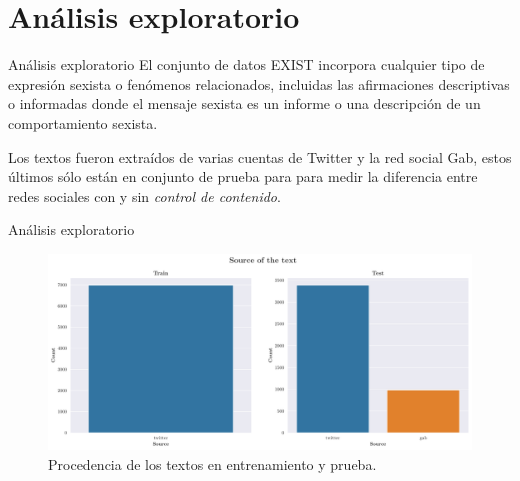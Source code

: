 \documentclass[10pt]{beamer}
\begin{document}
\section{Análisis exploratorio}
\begin{frame}{Análisis exploratorio}
\justify	
\small
El conjunto de datos EXIST incorpora cualquier tipo de expresión sexista o fenómenos relacionados, incluidas las afirmaciones descriptivas o informadas donde el mensaje sexista es un informe o una descripción de un comportamiento sexista. \medskip

Los textos fueron extraídos de varias cuentas de Twitter y la red social Gab, estos últimos sólo están en conjunto de prueba para para medir la diferencia entre redes sociales con y sin \emph{control de contenido}.

\begin{table}[H]
\centering
{}
\caption{Cantidad de textos en el conjunto de entrenamiento y prueba.}
\end{table}

\end{frame}

\begin{frame}{Análisis exploratorio}
\justify	
\small

\begin{figure}[H]
\centering
\includegraphics[width=0.8\linewidth]{images/source.pdf}
\caption{Procedencia de los textos en entrenamiento y prueba.}
\end{figure}

\end{frame}
\end{document}
